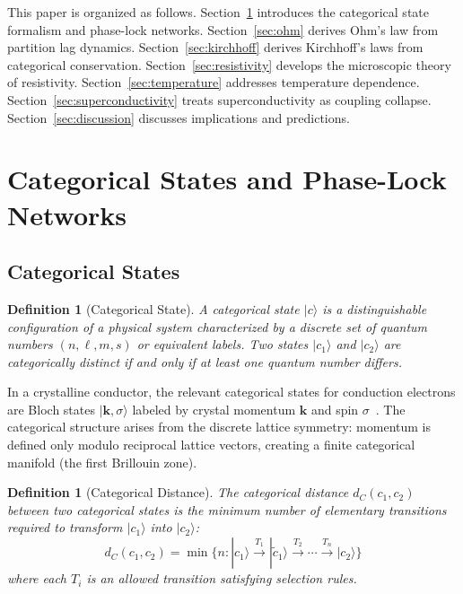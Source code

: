 \documentclass[twocolumn,showpacs,preprintnumbers,amsmath,amssymb,prd]{revtex4-2}
\newtheorem{definition}[theorem]{Definition}
\newcommand{\kvec}{\mathbf{k}}
\begin{document}
This paper is organized as follows. Section~\ref{sec:categorical} introduces the categorical state formalism and phase-lock networks. Section~\ref{sec:ohm} derives Ohm's law from partition lag dynamics. Section~\ref{sec:kirchhoff} derives Kirchhoff's laws from categorical conservation. Section~\ref{sec:resistivity} develops the microscopic theory of resistivity. Section~\ref{sec:temperature} addresses temperature dependence. Section~\ref{sec:superconductivity} treats superconductivity as coupling collapse. Section~\ref{sec:discussion} discusses implications and predictions.


\section{Categorical States and Phase-Lock Networks}
\label{sec:categorical}

\subsection{Categorical States}

\begin{definition}[Categorical State]
\label{def:categorical_state}
A categorical state $|c\rangle$ is a distinguishable configuration of a physical system characterized by a discrete set of quantum numbers $(n, \ell, m, s)$ or equivalent labels. Two states $|c_1\rangle$ and $|c_2\rangle$ are categorically distinct if and only if at least one quantum number differs.
\end{definition}

In a crystalline conductor, the relevant categorical states for conduction electrons are Bloch states $|\kvec, \sigma\rangle$ labeled by crystal momentum $\kvec$ and spin $\sigma$~\cite{Ashcroft1976}. The categorical structure arises from the discrete lattice symmetry: momentum is defined only modulo reciprocal lattice vectors, creating a finite categorical manifold (the first Brillouin zone).

\begin{definition}[Categorical Distance]
\label{def:categorical_distance}
The categorical distance $d_C(c_1, c_2)$ between two categorical states is the minimum number of elementary transitions required to transform $|c_1\rangle$ into $|c_2\rangle$:
\begin{equation}
d_C(c_1, c_2) = \min\{n : |c_1\rangle \xrightarrow{T_1} |\tilde{c}_1\rangle \xrightarrow{T_2} \cdots \xrightarrow{T_n} |c_2\rangle\}
\label{eq:categorical_distance}
\end{equation}
where each $T_i$ is an allowed transition satisfying selection rules.
\end{definition}
\end{document}
